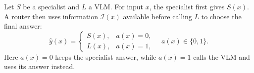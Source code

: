 Let $S$ be a specialist and $L$ a VLM. For input $x$, the specialist first gives $S(x)$. A router then uses information $\mathcal I(x)$ available before calling $L$ to choose the final answer:
\begin{equation}
\widehat y(x)=
\begin{cases}S(x),&a(x)=0,\\L(x),&a(x)=1,\end{cases}
\quad a(x)\in\{0,1\}.
\label{eq:decision}
\end{equation}
Here $a(x)=0$ keeps the specialist answer, while $a(x)=1$ calls the VLM and uses its answer instead.
